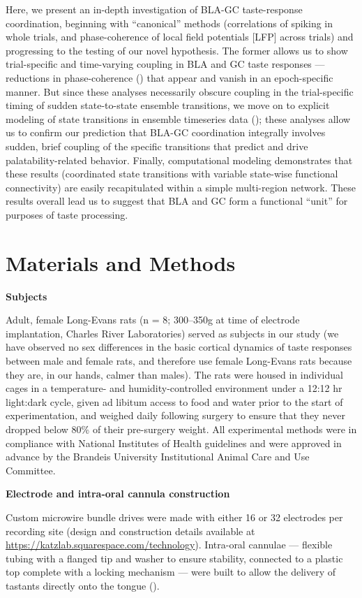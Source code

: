 \begin{refsection}
Here, we present an in-depth investigation of BLA-GC taste-response coordination, beginning with “canonical” methods (correlations of spiking in whole trials, and phase-coherence of local field potentials [LFP] across trials) and progressing to the testing of our novel hypothesis. The former allows us to show trial-specific and time-varying coupling in BLA and GC taste responses --- reductions in phase-coherence (\cite{stitt2017a}) that appear and vanish in an epoch-specific manner. But since these analyses necessarily obscure coupling in the trial-specific timing of sudden state-to-state ensemble transitions, we move on to explicit modeling of state transitions in ensemble timeseries data (\cite{rabiner1989a,sadacca2016a}); these analyses allow us to confirm our prediction that BLA-GC coordination integrally involves sudden, brief coupling of the specific transitions that predict and drive palatability-related behavior. Finally, computational modeling demonstrates that these results (coordinated state transitions with variable state-wise functional connectivity) are easily recapitulated within a simple multi-region network. These results overall lead us to suggest that BLA and GC form a functional “unit” for purposes of taste processing. 

\section{Materials and Methods}


\textbf{Subjects}\par
\noindent Adult, female Long-Evans rats (n = 8; 300–350g at time of electrode implantation, Charles River Laboratories) served as subjects in our study (we have observed no sex differences in the basic cortical dynamics of taste responses between male and female rats, and therefore use female Long-Evans rats because they are, in our hands, calmer than males). The rats were housed in individual cages in a temperature- and humidity-controlled environment under a 12:12 hr light:dark cycle, given ad libitum access to food and water prior to the start of experimentation, and weighed daily following surgery to ensure that they never dropped below 80\% of their pre-surgery weight. All experimental methods were in compliance with National Institutes of Health guidelines and were approved in advance by the Brandeis University Institutional Animal Care and Use Committee.

\smallskip
\noindent\textbf{Electrode and intra-oral cannula construction}\par
\noindent Custom microwire bundle drives were made with either 16 or 32 electrodes per recording site (design and construction details available at \url{https://katzlab.squarespace.com/technology}). Intra-oral cannulae --- flexible tubing with a flanged tip and washer to ensure stability, connected to a plastic top complete with a locking mechanism --- were built to allow the delivery of tastants directly onto the tongue (\cite{fontanini2006a}).


\end{refsection}
